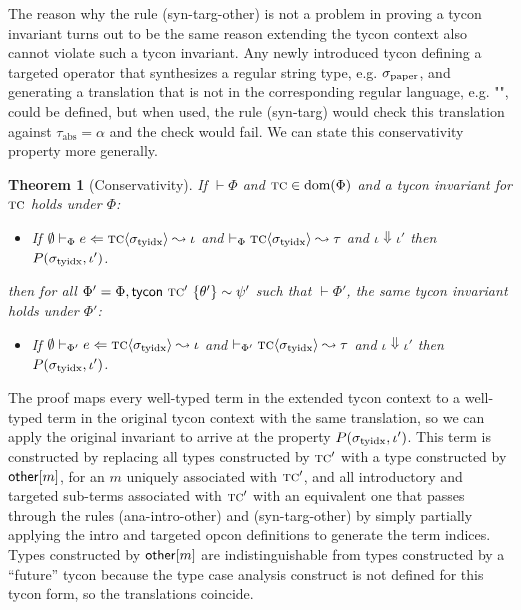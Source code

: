 \documentclass[10pt,preprint]{sigplanconf}
\newtheorem{theorem}{Theorem}
\newenvironment{proof-sketch}{\noindent{\emph{Proof Sketch.}}}{\qed}
\begin{document}
The reason why the rule (syn-targ-other) is not a problem in proving a tycon invariant turns out to be the same reason extending the tycon context also cannot violate such a tycon invariant. Any newly introduced tycon defining a targeted operator that synthesizes a regular string type, e.g. $\sigma_\text{paper}$, and generating a translation that is not in the corresponding regular language, e.g. $\texttt{""}$, could be defined, but when used, the rule (syn-targ) would check this translation against $\tau_\text{abs}=\alpha$ and the check would fail. %
 We can state this conservativity property more generally. 

\begin{theorem}[Conservativity] If $\vdash \Phi$ and $\textsc{tc} \in \text{dom}(\Phi)$ and a tycon invariant for $\textsc{tc}$ holds under $\Phi$: \begin{itemize}
\item If $\emptyset \vdash_{\Phi} e \Leftarrow {\textsc{tc}}\langle\sigma_\text{tyidx}\rangle \leadsto \iota$ and $\vdash_\Phi {{\textsc{tc}}\langle\sigma_\text{tyidx}\rangle} \leadsto \tau$ and $\iota \Downarrow \iota'$ then $P(\sigma_\text{tyidx}, \iota')$.
\end{itemize} then for all $\Phi' = \Phi, {\sf tycon}~\textsc{tc}' ~\{\theta'\} \sim \psi'$ such that $\vdash \Phi'$, the same tycon invariant holds under $\Phi'$: \begin{itemize}
\item If $\emptyset \vdash_{\Phi'} e \Leftarrow {\textsc{tc}}\langle\sigma_\text{tyidx}\rangle \leadsto \iota$ and $\vdash_{\Phi'}{{\textsc{tc}}\langle\sigma_\text{tyidx}\rangle}\leadsto{\tau}$ and $\iota \Downarrow \iota'$ then $P(\sigma_\text{tyidx}, \iota')$.
\end{itemize}
\end{theorem}
\begin{proof-sketch}
The proof maps every well-typed term in the extended tycon context to a well-typed term in the original tycon context with the same translation, so we can apply the original invariant to arrive at the property $P(\sigma_\text{tyidx}, \iota')$. This term is constructed by replacing all types constructed by $\textsc{tc}'$ with a type constructed by ${\sf other}[m]$, for an $m$ uniquely associated with $\textsc{tc}'$, and all introductory and targeted sub-terms associated with $\textsc{tc}'$ with an equivalent one that passes through the rules (ana-intro-other) and (syn-targ-other) by simply partially applying the intro and targeted opcon definitions to generate the term indices. Types constructed by ${\sf other}[m]$ are indistinguishable from types constructed by a ``future'' tycon because the type case analysis construct is not defined for this tycon form, so the translations coincide.\end{proof-sketch}
\end{document}
